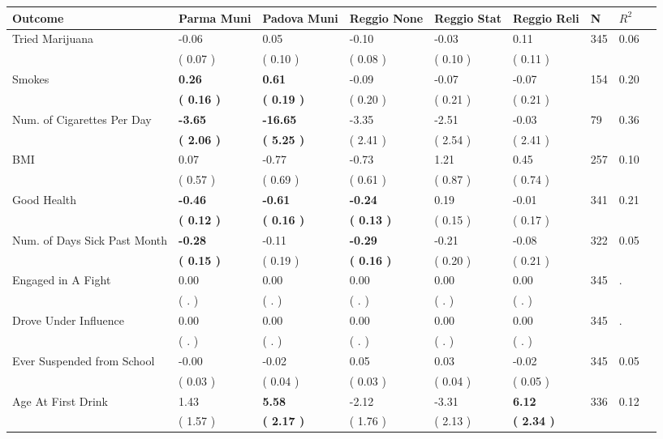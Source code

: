 \begin{tabular}{L{6.2cm} C{1.8cm} C{1.8cm} C{1.8cm} C{1.8cm} C{1.8cm} C{1.8cm} C{0.3cm} C{0.3cm}}
\toprule
 \textbf{Outcome} & \textbf{Parma Muni} & \textbf{Padova Muni} & \textbf{Reggio None} & \textbf{Reggio Stat} & \textbf{Reggio Reli} & \textbf{N} & \textbf{$ R^2$} \\
\midrule
Tried Marijuana &     -0.06 &      0.05 &     -0.10 &     -0.03 &      0.11  & 345 &       0.06 \\ 
 & (     0.07 ) & (     0.10 ) & (     0.08 ) & (     0.10 ) & (     0.11 )  & \\
Smokes & \textbf{     0.26} & \textbf{     0.61} &     -0.09 &     -0.07 &     -0.07  & 154 &       0.20 \\ 
 & \textbf{(     0.16 )} & \textbf{(     0.19 )} & (     0.20 ) & (     0.21 ) & (     0.21 )  & \\
Num. of Cigarettes Per Day & \textbf{    -3.65} & \textbf{   -16.65} &     -3.35 &     -2.51 &     -0.03  & 79 &       0.36 \\ 
 & \textbf{(     2.06 )} & \textbf{(     5.25 )} & (     2.41 ) & (     2.54 ) & (     2.41 )  & \\
BMI &      0.07 &     -0.77 &     -0.73 &      1.21 &      0.45  & 257 &       0.10 \\ 
 & (     0.57 ) & (     0.69 ) & (     0.61 ) & (     0.87 ) & (     0.74 )  & \\
Good Health & \textbf{    -0.46} & \textbf{    -0.61} & \textbf{    -0.24} &      0.19 &     -0.01  & 341 &       0.21 \\ 
 & \textbf{(     0.12 )} & \textbf{(     0.16 )} & \textbf{(     0.13 )} & (     0.15 ) & (     0.17 )  & \\
Num. of Days Sick Past Month & \textbf{    -0.28} &     -0.11 & \textbf{    -0.29} &     -0.21 &     -0.08  & 322 &       0.05 \\ 
 & \textbf{(     0.15 )} & (     0.19 ) & \textbf{(     0.16 )} & (     0.20 ) & (     0.21 )  & \\
Engaged in A Fight &      0.00 &      0.00 &      0.00 &      0.00 &      0.00  & 345 &          . \\ 
 & (        . ) & (        . ) & (        . ) & (        . ) & (        . )  & \\
Drove Under Influence &      0.00 &      0.00 &      0.00 &      0.00 &      0.00  & 345 &          . \\ 
 & (        . ) & (        . ) & (        . ) & (        . ) & (        . )  & \\
Ever Suspended from School &     -0.00 &     -0.02 &      0.05 &      0.03 &     -0.02  & 345 &       0.05 \\ 
 & (     0.03 ) & (     0.04 ) & (     0.03 ) & (     0.04 ) & (     0.05 )  & \\
Age At First Drink &      1.43 & \textbf{     5.58} &     -2.12 &     -3.31 & \textbf{     6.12}  & 336 &       0.12 \\ 
 & (     1.57 ) & \textbf{(     2.17 )} & (     1.76 ) & (     2.13 ) & \textbf{(     2.34 )}  & \\
\bottomrule
\end{tabular}
